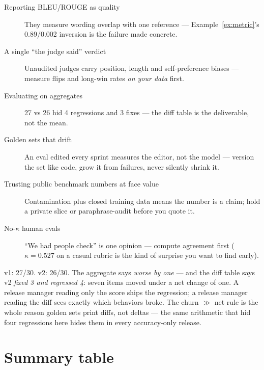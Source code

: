 \begin{description}
\item[Reporting BLEU/ROUGE as quality] They measure wording overlap
with one reference --- Example~\ref{ex:metric}'s 0.89/0.002 inversion
is the failure made concrete.
\item[A single ``the judge said'' verdict] Unaudited judges carry
position, length and self-preference biases --- measure flips and
long-win rates \emph{on your data} first.
\item[Evaluating on aggregates] 27 vs 26 hid 4 regressions and 3
fixes --- the diff table is the deliverable, not the mean.
\item[Golden sets that drift] An eval edited every sprint measures
the editor, not the model --- version the set like code, grow it
from failures, never silently shrink it.
\item[Trusting public benchmark numbers at face value]
Contamination plus closed training data means the number is a claim;
hold a private slice or paraphrase-audit before you quote it.
\item[No-$\kappa$ human evals] ``We had people check'' is one opinion
--- compute agreement first ($\kappa=0.527$ on a casual rubric is the
kind of surprise you want to find early).
\end{description}

\begin{example}
\label{ex:churn}
v1: 27/30. v2: 26/30. The aggregate says \emph{worse by one} --- and
the diff table says v2 \emph{fixed 3 and regressed 4}: seven items
moved under a net change of one. A release manager reading only the
score ships the regression; a release manager reading the diff sees
exactly which behaviors broke. The churn $\gg$ net rule is the whole
reason golden sets print diffs, not deltas --- the same arithmetic
that hid four regressions here hides them in every accuracy-only
release.
\end{example}

\section{Summary table}
\label{sec:lmsummary}

